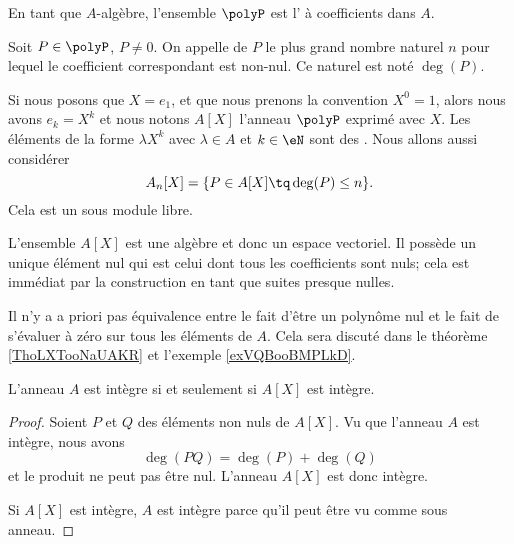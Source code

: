 \begin{definition}  \label{DefRGOooGIVzkx}
    En tant que \( A\)-algèbre, l'ensemble \( \polyP\) est l' à coefficients dans \( A\).
\end{definition}

\begin{definition}  \label{DefDegrePoly}
    Soit \( P \in \polyP\), \( P \neq 0 \). On appelle  de $P$ le plus grand nombre naturel $n$ pour lequel le coefficient correspondant est non-nul. Ce naturel est noté \( \deg(P) \).
\end{definition}

Si nous posons que \( X=e_1\), et que nous prenons la convention \( X^0=1\), alors nous avons \( e_k=X^k\) et nous notons \( A[X]\) l'anneau \( \polyP\) exprimé avec \( X\). Les éléments de la forme \( \lambda X^k\) avec \( \lambda\in A\) et \( k\in\eN\) sont des . Nous allons aussi considérer
\begin{equation}
    A_n[X]=\{ P\in A[X]\tq \deg(P)\leq n \}.
\end{equation}
Cela est un sous module libre.

\begin{remark}  \label{RemLIOooXHePSd}
    L'ensemble \( A[X]\) est une algèbre et donc un espace vectoriel. Il possède un unique élément nul qui est celui dont tous les coefficients sont nuls; cela est immédiat par la construction en tant que suites presque nulles.

    Il n'y a a priori pas équivalence entre le fait d'être un polynôme nul et le fait de s'évaluer à zéro sur tous les éléments de \( A\). Cela sera discuté dans le théorème \ref{ThoLXTooNaUAKR} et l'exemple \ref{exVQBooBMPLkD}.
\end{remark}

\begin{theorem}     \label{ThoBUEDrJ}
    L'anneau \( A\) est intègre si et seulement si \( A[X]\) est intègre.
\end{theorem}

\begin{proof}
    Soient \( P\) et \( Q\) des éléments non nuls de \( A[X]\). Vu que l'anneau \( A\) est intègre, nous avons
    \begin{equation}
        \deg(PQ)=\deg(P)+\deg(Q)
    \end{equation}
    et le produit ne peut pas être nul. L'anneau \( A[X]\) est donc intègre.

    Si \( A[X]\) est intègre, \( A\) est intègre parce qu'il peut être vu comme sous anneau.
\end{proof}

